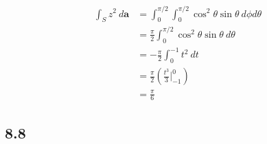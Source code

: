 \documentclass[10pt]{mypackage}
\begin{document}
\begin{enumerate}[(a)]
\begin{align*}
      \int_{S}^{} z^2\:d\mathbf{a} &= \int_{0}^{\pi/2}\int_{0}^{\pi/2} \cos^2\theta \sin\theta\:d\phi d\theta\\
                                   &= \frac{\pi}{2}\int_{0}^{\pi/2} \cos^2\theta\sin\theta\:d\theta\\
                                   &= -\frac{\pi}{2}\int_{0}^{-1} t^2\:dt \tag*{$t = \cos\theta$}\\
                                   &= \frac{\pi}{2}\left(\frac{t^3}{3}\bigr\vert_{-1}^{0}\right)\\
                                   &= \frac{\pi}{6}
    \end{align*}
\end{enumerate}
\subsection{8.8}%
\end{document}
